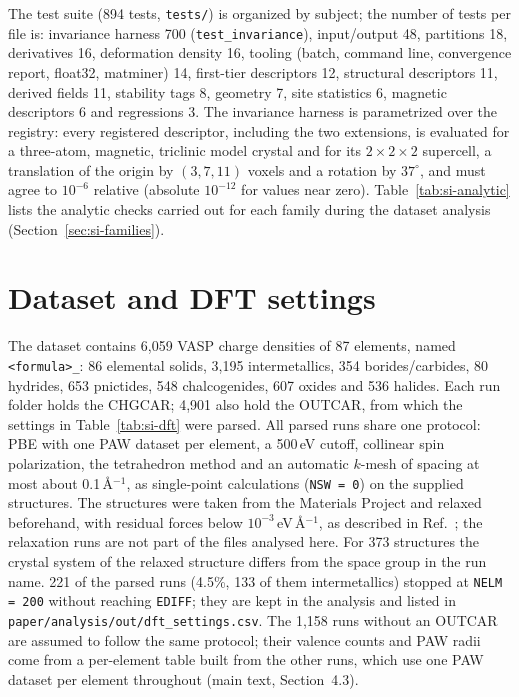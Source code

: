 \documentclass[11pt,a4paper]{article}
\begin{document}
The test suite (894 tests, \texttt{tests/}) is organized by subject; the
number of tests per file is: invariance harness 700 (\texttt{test\_invariance}),
input/output 48, partitions 18, derivatives 16, deformation density 16,
tooling (batch, command line, convergence report, float32, matminer) 14,
first-tier descriptors 12, structural descriptors 11, derived fields 11,
stability tags 8, geometry 7, site statistics 6, magnetic descriptors 6 and
regressions 3. The invariance harness is parametrized over the registry: every
registered descriptor, including the two extensions, is evaluated for a
three-atom, magnetic, triclinic model crystal and for its $2\times2\times2$
supercell, a translation of the origin by $(3,7,11)$ voxels and a rotation by
$37^\circ$, and must agree to $10^{-6}$ relative (absolute $10^{-12}$ for values
near zero). Table~\ref{tab:si-analytic} lists the analytic checks carried out
for each family during the dataset analysis (Section~\ref{sec:si-families}).



\section{Dataset and DFT settings}
\label{sec:si-dataset}

The dataset contains 6,059 VASP charge densities of 87 elements, named
\texttt{<formula>\_<space group>}: 86 elemental solids, 3,195 intermetallics,
354 borides/carbides, 80 hydrides, 653 pnictides, 548 chalcogenides, 607
oxides and 536 halides. Each run folder holds the CHGCAR; 4,901 also hold the
OUTCAR, from which the settings in Table~\ref{tab:si-dft} were parsed. All
parsed runs share one protocol: PBE with one PAW dataset per element, a
500\,eV cutoff, collinear spin polarization, the tetrahedron method and an
automatic $k$-mesh of spacing at most about 0.1\,\AA$^{-1}$, as single-point
calculations (\texttt{NSW = 0}) on the supplied structures. The structures
were taken from the Materials Project and relaxed beforehand, with residual
forces below $10^{-3}$\,eV\,\AA$^{-1}$, as described in Ref.~\cite{kumar2026};
the relaxation runs are not part of the files analysed here. For 373 structures the
crystal system of the relaxed structure differs from the space group in the
run name. 221 of the parsed runs (4.5\%, 133 of them intermetallics) stopped
at \texttt{NELM = 200} without reaching \texttt{EDIFF}; they are kept in the
analysis and listed in \texttt{paper/analysis/out/dft\_settings.csv}. The 1,158 runs without an OUTCAR are assumed to
follow the same protocol; their valence counts and PAW radii come from a
per-element table built from the other runs, which use one PAW dataset per
element throughout (main text, Section~4.3).
\end{document}
